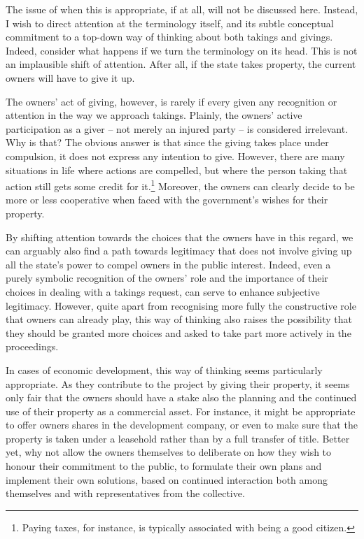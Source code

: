 The issue of when this is appropriate, if at all, will not be discussed here. Instead, I wish to direct attention at the terminology itself, and its subtle conceptual commitment to a top-down way of thinking about both takings and givings. Indeed, consider what happens if we turn the terminology on its head. This is not an implausible shift of attention. After all, if the state takes property, the current owners will have to give it up.

The owners' act of giving, however, is rarely if every given any recognition or attention in the way we approach takings. Plainly, the owners' active participation as a giver -- not merely an injured party -- is considered irrelevant. Why is that? The obvious answer is that since the giving takes place under compulsion, it does not express any intention to give. However, there are many situations in life where actions are compelled, but where the person taking that action still gets some credit for it.\footnote{Paying taxes, for instance, is typically associated with being a good citizen.} Moreover, the owners can clearly decide to be more or less cooperative when faced with the government's wishes for their property. 

By shifting attention towards the choices that the owners have in this regard, we can arguably also find a path towards legitimacy that does not involve giving up all the state's power to compel owners in the public interest. Indeed, even a purely symbolic recognition of the owners' role and the importance of their choices in dealing with a takings request, can serve to enhance subjective legitimacy. However, quite apart from recognising more fully the constructive role that owners can already play, this way of thinking also raises the possibility that they should be granted more choices and asked to take part more actively in the proceedings.


In cases of economic development, this way of thinking seems particularly appropriate. As they contribute to the project by giving their property, it seems only fair that the owners should have a stake also the planning and the continued use of their property as a commercial asset. For instance, it might be appropriate to offer owners shares in the development company, or even to make sure that the property is taken under a leasehold rather than by a full transfer of title. Better yet, why not allow the owners themselves to deliberate on how they wish to honour their commitment to the public, to formulate their own plans and implement their own solutions, based on continued interaction both among themselves and with representatives from the collective.

